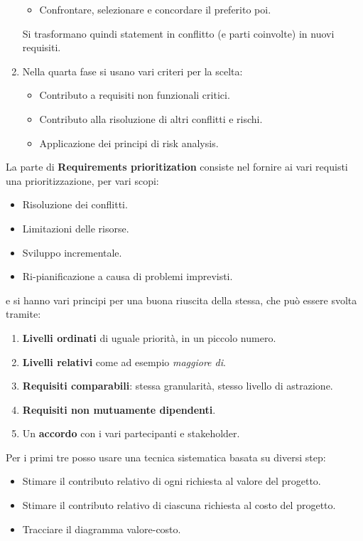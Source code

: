 \begin{enumerate}
\begin{itemize}
              \item Confrontare, selezionare e concordare il preferito poi.
          \end{itemize}
          Si trasformano quindi statement in conflitto (e parti coinvolte) in nuovi requisiti.
    \item Nella quarta fase si usano vari criteri per la scelta:
          \begin{itemize}
              \item Contributo a requisiti non funzionali critici.
              \item Contributo alla risoluzione di altri conflitti e rischi.
              \item Applicazione dei principi di risk analysis.
          \end{itemize}
\end{enumerate}

La parte di \textbf{Requirements prioritization} consiste nel fornire ai vari
requisti una prioritizzazione, per vari scopi:
\begin{itemize}
    \item Risoluzione dei conflitti.
    \item Limitazioni delle risorse.
    \item Sviluppo incrementale.
    \item Ri-pianificazione a causa di problemi imprevisti.
\end{itemize}
e si hanno vari principi per una buona riuscita della stessa, che può essere
svolta tramite:
\begin{enumerate}
    \item \textbf{Livelli ordinati} di uguale priorità, in un piccolo numero.
    \item \textbf{Livelli relativi} come ad esempio \textit{maggiore di}.
    \item \textbf{Requisiti comparabili}: stessa granularità, stesso livello di
          astrazione.
    \item \textbf{Requisiti non mutuamente dipendenti}.
    \item Un \textbf{accordo} con i vari partecipanti e stakeholder.
\end{enumerate}
Per i primi tre posso usare una tecnica sistematica basata su diversi step:
\begin{itemize}
    \item Stimare il contributo relativo di ogni richiesta al valore del progetto.
    \item Stimare il contributo relativo di ciascuna richiesta al costo del progetto.
    \item Tracciare il diagramma valore-costo.
\end{itemize}

